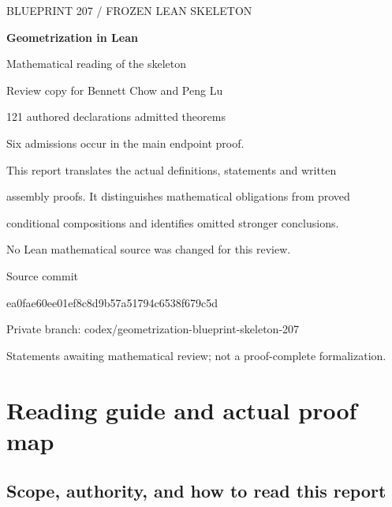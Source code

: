 \documentclass[
  letterpaper,
  11pt]{article}
\author{}
\date{}
\begin{document}
\hypersetup{pageanchor=false}
\begin{titlepage}
\thispagestyle{empty}
\vspace*{0.45in}
{\sffamily\small\color{reviewgray}BLUEPRINT 207 / FROZEN LEAN SKELETON}\par
\vspace{0.7in}
{\Huge\bfseries\color{reviewnavy}Geometrization in Lean}\par
\vspace{0.25in}
{\LARGE Mathematical reading of the skeleton}\par
\vspace{0.45in}
{\Large Review copy for Bennett Chow and Peng Lu}\par
\vspace{0.7in}
{\large 121 authored declarations\quad\textbar{} admitted theorems}\par
\vspace{0.14in}
{\large Six admissions occur in the main endpoint proof.}\par
\vspace{0.6in}
This report translates the actual definitions, statements and written\par
assembly proofs. It distinguishes mathematical obligations from proved\par
conditional compositions and identifies omitted stronger conclusions.\par
\vspace{0.35in}
No Lean mathematical source was changed for this review.\par
\vfill
{\small Source commit}\par
{\footnotesize\ttfamily ea0fae60ee01ef8c8d9b57a51794c6538f679c5d}\par
\vspace{0.12in}
{\small Private branch: codex/geometrization-blueprint-skeleton-207}\par
\vspace{0.35in}
{\small Statements awaiting mathematical review; not a proof-complete formalization.}
\end{titlepage}
\setcounter{page}{1}
\hypersetup{pageanchor=true}

{
\hypersetup{linkcolor=}
\setcounter{tocdepth}{2}
\tableofcontents
}
\section{Reading guide and actual proof map}\label{overview}

\subsection{Scope, authority, and how to read this
report}\label{reading-guide}
\end{document}
